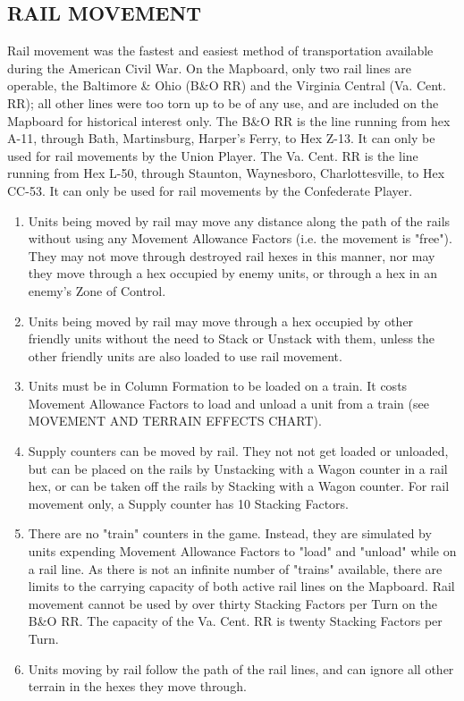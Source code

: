 \subsection{RAIL MOVEMENT}

Rail movement was the fastest and easiest method of transportation available during the American Civil War. On the Mapboard, only two rail lines are operable, the Baltimore \& Ohio (B\&O RR) and the Virginia Central (Va. Cent. RR); all other lines were too torn up to be of any use, and are included on the Mapboard for historical interest only. The B\&O RR is the line running from hex A-11, through Bath, Martinsburg, Harper's Ferry, to Hex Z-13. It can only be used for rail movements by the Union Player. The Va. Cent. RR is the line running from Hex L-50, through Staunton, Waynesboro, Charlottesville, to Hex CC-53. It can only be used for rail movements by the Confederate Player.

\begin{enumerate}[label=(\alph*)]
  \item Units being moved by rail may move any distance along the path of the rails without using any Movement Allowance Factors (i.e. the movement is "free"). They may not move through destroyed rail hexes in this manner, nor may they move through a hex occupied by enemy units, or through a hex in an enemy's Zone of Control.

  \item Units being moved by rail may move through a hex occupied by other friendly units without the need to Stack or Unstack with them, unless the other friendly units are also loaded to use rail movement.

  \item Units must be in Column Formation to be loaded on a train. It costs Movement Allowance Factors to load and unload a unit from a train (see MOVEMENT AND TERRAIN EFFECTS CHART).

  \item Supply counters can be moved by rail. They not not get loaded or unloaded, but can be placed on the rails by Unstacking with a Wagon counter in a rail hex, or can be taken off the rails by Stacking with a Wagon counter. For rail movement only, a Supply counter has 10 Stacking Factors.

  \item There are no "train" counters in the game. Instead, they are simulated by units expending Movement Allowance Factors to "load" and "unload" while on a rail line. As there is not an infinite number of "trains" available, there are limits to the carrying capacity of both active rail lines on the Mapboard. Rail movement cannot be used by over thirty Stacking Factors per Turn on the B\&O RR. The capacity of the Va. Cent. RR is twenty Stacking Factors per Turn.

  \item Units moving by rail follow the path of the rail lines, and can ignore all other terrain in the hexes they move through.
\end{enumerate}